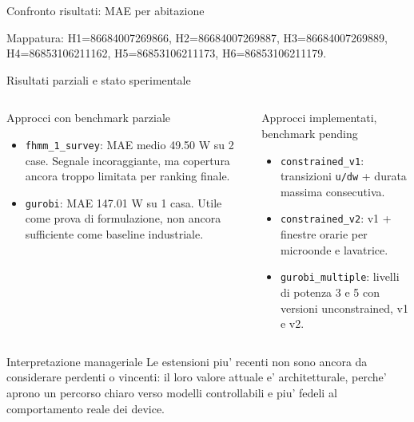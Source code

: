 \documentclass[aspectratio=169]{beamer}
\newcommand{\code}[1]{\texttt{#1}}
\begin{document}
\begin{frame}{Confronto risultati: MAE per abitazione}
\scriptsize
{}

\vspace{0.5em}
\tiny
Mappatura: H1=86684007269866, H2=86684007269887, H3=86684007269889, H4=86853106211162, H5=86853106211173, H6=86853106211179.
\end{frame}

\begin{frame}{Risultati parziali e stato sperimentale}
\small
\begin{columns}[T]
\begin{block}{Approcci con benchmark parziale}
\begin{itemize}
  \item \code{fhmm\_1\_survey}: MAE medio 49.50 W su 2 case. Segnale incoraggiante, ma copertura ancora troppo limitata per ranking finale.
  \item \code{gurobi}: MAE 147.01 W su 1 casa. Utile come prova di formulazione, non ancora sufficiente come baseline industriale.
\end{itemize}
\end{block}

\begin{block}{Approcci implementati, benchmark pending}
\begin{itemize}
  \item \code{constrained\_v1}: transizioni \code{u/dw} + durata massima consecutiva.
  \item \code{constrained\_v2}: v1 + finestre orarie per microonde e lavatrice.
  \item \code{gurobi\_multiple}: livelli di potenza 3 e 5 con versioni unconstrained, v1 e v2.
\end{itemize}
\end{block}
\end{columns}

\vspace{0.4em}
\begin{block}{Interpretazione manageriale}
\small
Le estensioni piu' recenti non sono ancora da considerare perdenti o vincenti: il loro valore attuale e' architetturale, perche' aprono un percorso chiaro verso modelli controllabili e piu' fedeli al comportamento reale dei device.
\end{block}
\end{frame}
\end{document}
